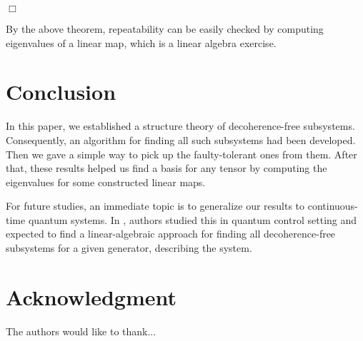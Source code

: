 \documentclass[journal]{IEEEtran}
\begin{document}
\hfill $\Box$

By the above theorem, repeatability  can be easily checked by computing eigenvalues of a linear map, which is a linear algebra exercise.  
\section{Conclusion}
In this paper, we established a structure theory of decoherence-free subsystems. Consequently, an algorithm for finding all such subsystems had been developed. Then we gave a simple way to pick up the faulty-tolerant ones from them. After that, these results helped us find a basis for any tensor by computing the eigenvalues for some constructed linear maps. 

For future studies, an immediate topic is to generalize our results to continuous-time quantum systems. In \cite{ticozzi2008quantum}, authors  studied this in quantum control setting and expected to find a linear-algebraic approach for finding all decoherence-free subsystems  for a given generator, describing the system. 
\section*{Acknowledgment}


The authors would like to thank...










%
%
%


% 
\end{document}
